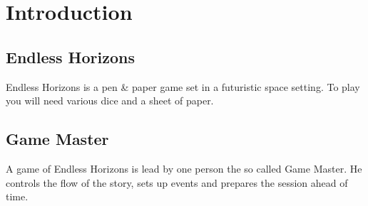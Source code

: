 \chapter{Introduction}
\label{chap:Introduction}


\section{Endless Horizons}
\label{sec:1-Endless Horizons}

Endless Horizons is a pen \& paper game set in a futuristic space setting. To
play you will need various dice and a sheet of paper.

\section{Game Master}
\label{sec:1-Game Master}

A game of Endless Horizons is lead by one person the so called Game Master.
He controls the flow of the story, sets up events and prepares the
session ahead of time.
